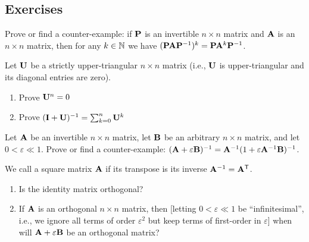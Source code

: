 \subsection*{Exercises}

\begin{exercise}
Prove or find a counter-example: if $\mathbf{P}$ is an invertible $n\times n$
matrix and $\mathbf{A}$ is an $n\times n$ matrix, then for any $k\in\mathbb{N}$ we
have $(\mathbf{P}\mathbf{A}\mathbf{P}^{-1})^{k} = \mathbf{P}\mathbf{A}^{k}\mathbf{P}^{-1}$.
\end{exercise}

\begin{exercise}
Let $\mathbf{U}$ be a strictly upper-triangular $n\times n$ matrix (i.e.,
$\mathbf{U}$ is upper-triangular and its diagonal entries are zero).
\begin{enumerate}
\item Prove $\mathbf{U}^{n}=0$
\item Prove $(\mathbf{I}+\mathbf{U})^{-1} = \sum^{n}_{k=0}\mathbf{U}^{k}$
\end{enumerate}
\end{exercise}

\begin{exercise}
Let $\mathbf{A}$ be an invertible $n\times n$ matrix, let $\mathbf{B}$ be an
arbitrary $n\times n$ matrix, and let $0<\varepsilon\ll1$.
Prove or find a counter-example:
$(\mathbf{A}+\varepsilon\mathbf{B})^{-1} = \mathbf{A}^{-1}(1 + \varepsilon\mathbf{A}^{-1}\mathbf{B})^{-1}$.
\end{exercise}

\begin{exercise}
We call a square matrix $\mathbf{A}$  if its transpose
is its inverse $\mathbf{A}^{-1}=\mathbf{A}^{\mathsf{T}}$.
\begin{enumerate}
\item Is the identity matrix orthogonal?
\item If $\mathbf{A}$ is an orthogonal $n\times n$ matrix, then [letting
  $0<\varepsilon\ll1$ be ``infinitesimal'', i.e., we ignore all terms of
  order $\varepsilon^{2}$ but keep terms of first-order in $\varepsilon$]
  when will $\mathbf{A}+\varepsilon\mathbf{B}$ be an orthogonal matrix?
\end{enumerate}
\end{exercise}